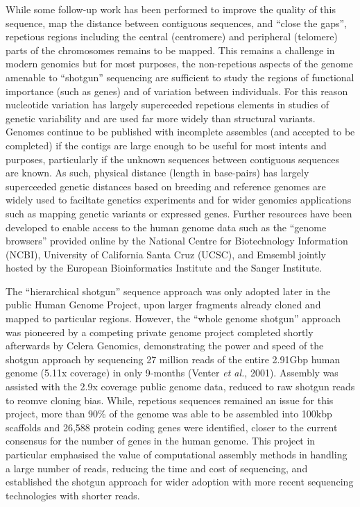 While some follow-up work has been performed to improve the quality of this sequence, map the distance between contiguous sequences, and ``close the gaps'', repetious regions including the central (centromere) and peripheral (telomere) parts of the chromosomes remains to be mapped. This remains a challenge in modern genomics but for most purposes, the non-repetious aspects of the genome amenable to ``shotgun'' sequencing are sufficient to study the regions of functional importance (such as genes) and of variation between individuals. For this reason nucleotide variation has largely superceeded repetious elements in studies of genetic variability and are used far more widely than structural variants. Genomes continue to be published with incomplete assembles (and accepted to be completed) if the contigs are large enough to be useful for most intents and purposes, particularly if the unknown sequences between contiguous sequences are known. As such, physical distance (length in base-pairs) has largely superceeded genetic distances based on breeding and reference genomes are widely used to faciltate genetics experiments and for wider genomics applications such as mapping genetic variants or expressed genes. Further resources have been developed to enable access to the human genome data such as the ``genome browsers'' provided online by the National Centre for Biotechnology Information (NCBI), University of California Santa Cruz (UCSC), and Emsembl jointly hosted by the European Bioinformatics Institute and the Sanger Institute. 

The ``hierarchical shotgun'' sequence approach was only adopted later in the public Human Genome Project, upon larger fragments already cloned and mapped to particular regions. However, the ``whole genome shotgun'' approach was pioneered by a competing private genome project completed shortly afterwards by Celera Genomics, demonstrating the power and speed of the shotgun approach by sequencing 27 million reads of the entire 2.91Gbp human genome (5.11x coverage) in only 9-months (Venter \textit{et al.}, 2001). Assembly was assisted with the 2.9x coverage public genome data, reduced to raw shotgun reads to reomve cloning bias. While, repetious sequences remained an issue for this project, more than 90\% of the genome was able to be assembled into 100kbp scaffolds and 26,588 protein coding genes were identified, closer to the current consensus for the number of genes in the human genome. This project in particular emphasised the value of computational assembly methods in handling a large number of reads, reducing the time and cost of sequencing, and established the shotgun approach for wider adoption with more recent sequencing technologies with shorter reads.

